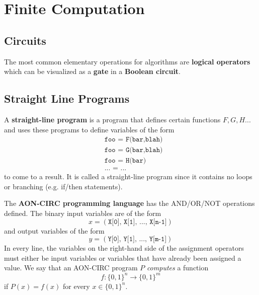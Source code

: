 \section{Finite Computation}

\subsection{Circuits}

  \begin{definition}
    The most common elementary operations for algorithms are \textbf{logical operators} which can be visualized as a \textbf{gate} in a \textbf{Boolean circuit}. 
  \end{definition}

\subsection{Straight Line Programs}

  \begin{definition}
    A \textbf{straight-line program} is a program that defines certain functions $F, G, H...$ and uses these programs to define variables of the form 
    \begin{align*}
      &\texttt{foo = F(bar,blah)} \\
      &\texttt{foo = G(bar,blah)} \\
      &\texttt{foo = H(bar)} \\
      &\texttt{... = ...}
    \end{align*}
    to come to a result. It is called a straight-line program since it contains no loops or branching (e.g. if/then statements). 

    The \textbf{AON-CIRC programming language} has the AND/OR/NOT operations defined. The binary input variables are of the form 
    \[x = (\texttt{X[0], X[1], ..., X[n-1]})\]
    and output variables of the form 
    \[y = (\texttt{Y[0], Y[1], ..., Y[m-1]})\]
    In every line, the variables on the right-hand side of the assignment operators must either be input variables or variables that have already been assigned a value. We say that an AON-CIRC program $P$ \textit{computes} a function 
    \[f: \{0,1\}^n \longrightarrow \{0,1\}^m\]
    if $P(x) = f(x)$ for every $x \in \{0,1\}^n$.
  \end{definition}

